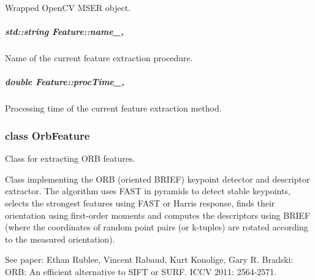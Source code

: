 Wrapped Open\-C\-V M\-S\-E\-R object. 

\hypertarget{group___feature_extractor_a46e9fc1f327aaafb10de2c0425d311aa}{
\subparagraph[{name\-\_\-}]{\setlength{\rightskip}{0pt plus 5cm}std\-::string Feature\-::name\-\_\-\hspace{0.3cm}{\ttfamily [protected]}, {\ttfamily [inherited]}}}\label{group___feature_extractor_a46e9fc1f327aaafb10de2c0425d311aa}


Name of the current feature extraction procedure. 

\hypertarget{group___feature_extractor_a1b176bd48aad30b553e0f87f0264c3d0}{
\subparagraph[{proc\-Time\-\_\-}]{\setlength{\rightskip}{0pt plus 5cm}double Feature\-::proc\-Time\-\_\-\hspace{0.3cm}{\ttfamily [protected]}, {\ttfamily [inherited]}}}\label{group___feature_extractor_a1b176bd48aad30b553e0f87f0264c3d0}


Processing time of the current feature extraction method. 

\label{class_orb_feature}
\hypertarget{group___feature_extractor_class_orb_feature}{}
\subsubsection{class Orb\-Feature}
Class for extracting O\-R\-B features. 

Class implementing the O\-R\-B (oriented B\-R\-I\-E\-F) keypoint detector and descriptor extractor. The algorithm uses F\-A\-S\-T in pyramids to detect stable keypoints, selects the strongest features using F\-A\-S\-T or Harris response, finds their orientation using first-\/order moments and computes the descriptors using B\-R\-I\-E\-F (where the coordinates of random point pairs (or k-\/tuples) are rotated according to the measured orientation).

See paper\-: Ethan Rublee, Vincent Rabaud, Kurt Konolige, Gary R. Bradski\-: O\-R\-B\-: An efficient alternative to S\-I\-F\-T or S\-U\-R\-F. I\-C\-C\-V 2011\-: 2564-\/2571. 

